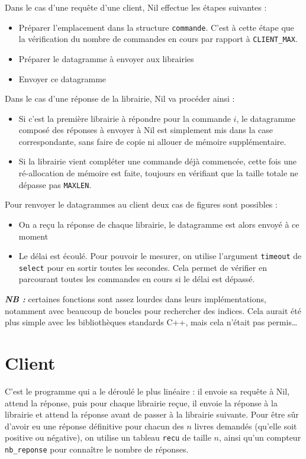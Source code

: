 \documentclass[10pt,a4paper]{article}
\renewcommand{\ss}{\vspace{\baselineskip}}
\begin{document}
\begin{multicols}{2}
\ss

Dans le cas d'une requête d'une client, Nil effectue les étapes suivantes :
\begin{itemize}
	\item Préparer l'emplacement dans la structure \texttt{commande}. C'est à cette étape que la vérification du nombre de commandes en cours par rapport à \texttt{CLIENT\_MAX}.
	\item Préparer le datagramme à envoyer aux librairies
	\item Envoyer ce datagramme
\end{itemize}

Dans le cas d'une réponse de la librairie, Nil va procéder ainsi :
\begin{itemize}
	\item Si c'est la première librairie à répondre pour la commande $i$, le datagramme composé des réponses à envoyer à Nil est simplement mis dans la case correspondante, sans faire de copie ni allouer de mémoire supplémentaire.
	\item Si la librairie vient compléter une commande déjà commencée, cette fois une ré-allocation de mémoire est faite, toujours en vérifiant que la taille totale ne dépasse pas \texttt{MAXLEN}.
\end{itemize}

\ss

Pour renvoyer le datagrammes au client deux cas de figures sont possibles :
\begin{itemize}
	\item On a reçu la réponse de chaque librairie, le datagramme est alors envoyé à ce moment
	\item Le délai est écoulé. Pour pouvoir le mesurer, on utilise l'argument \texttt{timeout} de \texttt{select} pour en sortir toutes les secondes. Cela permet de vérifier en parcourant toutes les commandes en cours si le délai est dépassé.
\end{itemize}

\ss
\noindent\textbf{\textit{NB :}} certaines fonctions sont assez lourdes dans leurs implémentations, notamment avec beaucoup de boucles pour rechercher des indices. Cela aurait été plus simple avec les bibliothèques standards C++, mais cela n'était pas permis\ldots


\section{Client}

C'est le programme qui a le déroulé le plus linéaire : il envoie sa requête à Nil, attend la réponse, puis pour chaque librairie reçue, il envoie la réponse à la librairie et attend la réponse avant de passer à la librairie suivante.
Pour être sûr d'avoir eu une réponse définitive pour chacun des $n$ livres demandés (qu'elle soit positive ou négative), on utilise un tableau \texttt{recu} de taille $n$, ainsi qu'un compteur \texttt{nb\_reponse} pour connaître le nombre de réponses.


\end{multicols}
\end{document}
